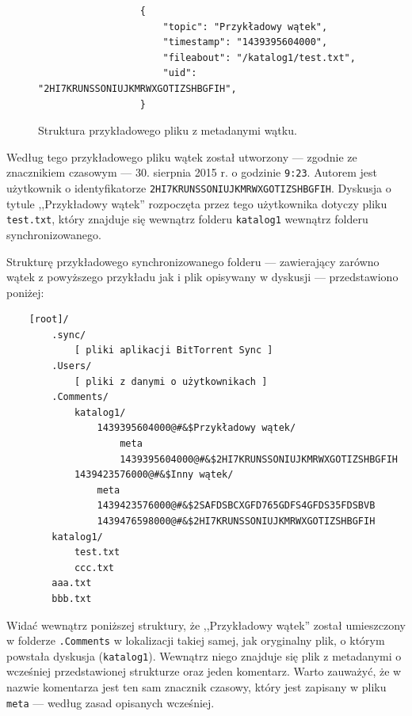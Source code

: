 \begin{figure}[htb]
  \label{thread}
  \begin{verbatim}
                  {
                      "topic": "Przykładowy wątek", 
                      "timestamp": "1439395604000", 
                      "fileabout": "/katalog1/test.txt",
                      "uid": "2HI7KRUNSSONIUJKMRWXGOTIZSHBGFIH", 
                  }
  \end{verbatim}
  \caption{Struktura przykładowego pliku z metadanymi wątku.}
\end{figure}

Według tego przykładowego pliku wątek został utworzony --- zgodnie ze znacznikiem czasowym --- 30. sierpnia 2015 r. o godzinie \texttt{9:23}. Autorem jest użytkownik o identyfikatorze \texttt{2HI7KRU\-NSSONIUJ\-KMRWXGOTI\-ZSHBGFIH}. Dyskusja o tytule ,,Przykładowy wątek'' rozpoczęta przez tego użytkownika dotyczy pliku \texttt{test.txt}, który znajduje się wewnątrz folderu \texttt{katalog1} wewnątrz folderu synchronizowanego.

Strukturę przykładowego synchronizowanego folderu --- zawierający zarówno wątek z powyższego przykładu jak i plik opisywany w dyskusji --- przedstawiono poniżej:

\begin{minipage}{\linewidth}
\vspace{1em}
\begin{verbatim}
    [root]/
        .sync/
            [ pliki aplikacji BitTorrent Sync ]
        .Users/
            [ pliki z danymi o użytkownikach ]
        .Comments/
            katalog1/
                1439395604000@#&$Przykładowy wątek/
                    meta
                    1439395604000@#&$2HI7KRUNSSONIUJKMRWXGOTIZSHBGFIH
            1439423576000@#&$Inny wątek/
                meta
                1439423576000@#&$2SAFDSBCXGFD765GDFS4GFDS35FDSBVB
                1439476598000@#&$2HI7KRUNSSONIUJKMRWXGOTIZSHBGFIH
        katalog1/
            test.txt
            ccc.txt
        aaa.txt
        bbb.txt
\end{verbatim}
\vspace{1em}
\end{minipage}

Widać wewnątrz poniższej struktury, że ,,Przykładowy wątek'' został umieszczony w folderze \texttt{.Comments} w lokalizacji takiej samej, jak oryginalny plik, o którym powstała dyskusja (\texttt{katalog1}). Wewnątrz niego znajduje się plik z metadanymi o wcześniej przedstawionej strukturze oraz jeden komentarz. Warto zauważyć, że w nazwie komentarza jest ten sam znacznik czasowy, który jest zapisany w pliku \texttt{meta} --- według zasad opisanych wcześniej.

